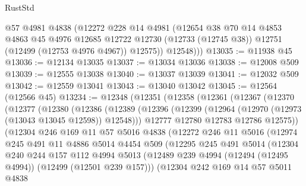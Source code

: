 \begin{lexlean}{RustStd}
\begin{coremodule}
{\begin{coremodule}
{{{{{{{{{{{{{{{{{{{{{{{{{{{{{{{{{{{{{{{{{{{{{{{{{{{{{{{{{{{{{{{{{{{{{{{{{{{{{{{{          @57
          @4981
          @4838
          (@12272
            @228
            @14
            @4981
            (@12654
              @38
              @70
              @14
              @4853
              @4863
              @45
              @4976
              @12685
              @12722
              @12730
              (@12733 (@12745 @38))
              @12751
              (@12499 (@12753 @4976 @4967))
              @12575))
          @12548)))
@13035 := @11938 @45
@13036 := @12134 @13035
@13037 := @13034 @13036
@13038 := @12008 @509
@13039 := @12555 @13038
@13040 := @13037 @13039
@13041 := @12032 @509
@13042 := @12559 @13041
@13043 := @13040 @13042
@13045 := @12564 (@12566 @45)
@13234 := @12348
    (@12351
      (@12358
        (@12361
          (@12367
            (@12370
              (@12377
                (@12380
                  (@12386
                    (@12389
                      (@12396
                        (@12399 (@12964 (@12970 (@12973 (@13043 @13045 @12598)) @12548)))
                        @12777
                        @12780
                        @12783
                        @12786
                        @12575))
                    (@12304
                      @246
                      @169
                      @11
                      @57
                      @5016
                      @4838
                      (@12272
                        @246
                        @11
                        @5016
                        (@12974
                          @245
                          @491
                          @11
                          @4886
                          @5014
                          @4454
                          @509
                          (@12295
                            @245
                            @491
                            @5014
                            (@12304
                              @240
                              @244
                              @157
                              @112
                              @4994
                              @5013
                              (@12489
                                @239
                                @4994
                                (@12494 (@12495 @4994))
                                (@12499 (@12501 @239 @157)))
                              (@12304
                                @242
                                @169
                                @14
                                @57
                                @5011
                                @4838
}}}}}}}}}}}}}}}}}}}}}}}}}}}}}}}}}}}}}}}}}}}}}}}}}}}}}}}}}}}}}}}}}}}}}}}}}}}}}}}}
\end{coremodule}}
\end{coremodule}
\end{lexlean}
